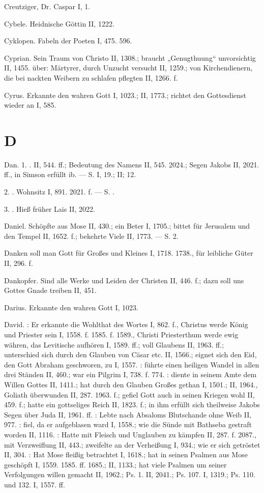 Creutziger, Dr. Caspar I, 1.

Cybele. Heidnische Göttin II, 1222.

Cyklopen. Fabeln der Poeten I, 475. 596.

Cyprian. Sein Traum von Christo II, 1308.; braucht „Genugthuung“ unvorsichtig II, 1455.  über: Märtyrer, durch Unzucht versucht II, 1259.; von Kirchendienern, die bei nackten Weibern zu schlafen pflegten II, 1266. f.

Cyrus. Erkannte den wahren Gott I, 1023.; II, 1773.; richtet den Gottesdienst wieder an I, 585.

\section{D}

Dan. 1. . II, 544. ff.; Bedeutung des Namens II, 545. 2024.; Segen Jakobs II, 2021. ff., in Simson erfüllt ib. — S.  I, 19.; II;  12.

2. . Wohnsitz I, 891. 2021. f. — S. .

3. . Hieß früher Lais II, 2022.

Daniel. Schöpfte aus Mose II, 430.; ein Beter I, 1705.; bittet für Jerusalem und den Tempel II, 1652. f.; bekehrte Viele II, 1773. — S.  2.

Danken soll man Gott für Großes und Kleines I, 1718. 1738., für leibliche Güter II, 296. f.

Dankopfer. Sind alle Werke und Leiden der Christen II, 446. f.; dazu soll uns Gottes Gnade treiben II, 451.

Darius. Erkannte den wahren Gott I, 1023.

David. : Er erkannte die Wohlthat des Wortes I, 862. f., Christus werde König und Priester sein I, 1558. f. 1585. f. 1589., Christi Priesterthum werde ewig währen, das Levitische aufhören I, 1589. ff.; voll Glaubens II, 1963. ff.; unterschied sich durch den Glauben von Cäsar etc. II, 1566.; eignet sich den Eid, den Gott Abraham geschworen, zu I, 1557. : führte einen heiligen Wandel in allen drei Ständen II, 460.; war ein Pilgrim I, 738. f. 774. : diente in seinem Amte dem Willen Gottes II, 1411.; hat durch den Glauben Großes gethan I, 1501.; II, 1964., Goliath überwunden II, 287. 1963. f.; gefiel Gott auch in seinen Kriegen wohl II, 459. f.; hatte ein gottseliges Reich II, 1823. f.; in ihm erfüllt sich theilweise Jakobs Segen über Juda II, 1961. ff. : Lebte nach Absaloms Blutschande ohne Weib II, 977. : fiel, da er aufgeblasen ward I, 1558.; wie die Sünde mit Bathseba gestraft worden II, 1116. : Hatte mit Fleisch und Unglauben zu kämpfen II, 287. f. 2087., mit Verzweiflung II, 443.; zweifelte an der Verheißung I, 934.; wie er sich getröstet II, 304. : Hat Mose fleißig betrachtet I, 1618.; hat in seinen Psalmen aus Mose geschöpft I, 1559. 1585. ff. 1685.; II, 1133.; hat viele Psalmen um seiner Verfolgungen willen gemacht II, 1962.; Ps. 1. II, 2041.; Ps. 107. I, 1319.; Ps. 110. und 132. I, 1557. ff.


